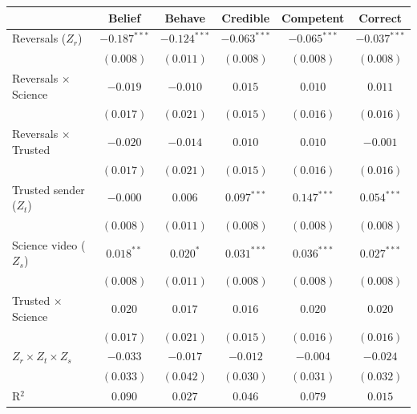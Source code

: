 
\begin{table}
\begin{center}
\begin{tabular}{l c c || c c || c}
\hline
 & Belief & Behave & Credible & Competent & Correct \\
\hline
Reversals ($Z_r$)           & $-0.187^{***}$ & $-0.124^{***}$ & $-0.063^{***}$ & $-0.065^{***}$ & $-0.037^{***}$ \\
                            & $(0.008)$      & $(0.011)$      & $(0.008)$      & $(0.008)$      & $(0.008)$      \\
Reversals $\times$ Science  & $-0.019$       & $-0.010$       & $0.015$        & $0.010$        & $0.011$        \\
                            & $(0.017)$      & $(0.021)$      & $(0.015)$      & $(0.016)$      & $(0.016)$      \\
Reversals $\times$ Trusted  & $-0.020$       & $-0.014$       & $0.010$        & $0.010$        & $-0.001$       \\
                            & $(0.017)$      & $(0.021)$      & $(0.015)$      & $(0.016)$      & $(0.016)$      \\
Trusted sender ($Z_t$)      & $-0.000$       & $0.006$        & $0.097^{***}$  & $0.147^{***}$  & $0.054^{***}$  \\
                            & $(0.008)$      & $(0.011)$      & $(0.008)$      & $(0.008)$      & $(0.008)$      \\
Science video ($Z_s$)       & $0.018^{**}$   & $0.020^{*}$    & $0.031^{***}$  & $0.036^{***}$  & $0.027^{***}$  \\
                            & $(0.008)$      & $(0.011)$      & $(0.008)$      & $(0.008)$      & $(0.008)$      \\
Trusted $\times$ Science    & $0.020$        & $0.017$        & $0.016$        & $0.020$        & $0.020$        \\
                            & $(0.017)$      & $(0.021)$      & $(0.015)$      & $(0.016)$      & $(0.016)$      \\
$Z_r \times Z_t \times Z_s$ & $-0.033$       & $-0.017$       & $-0.012$       & $-0.004$       & $-0.024$       \\
                            & $(0.033)$      & $(0.042)$      & $(0.030)$      & $(0.031)$      & $(0.032)$      \\
\hline
R$^2$                       & $0.090$        & $0.027$        & $0.046$        & $0.079$        & $0.015$        \\

\end{tabular}
\end{center}
\end{table}
